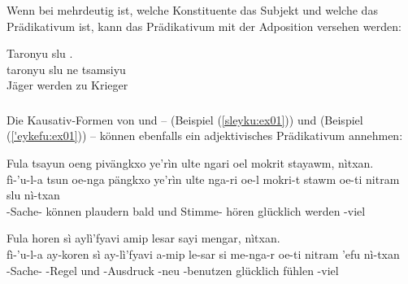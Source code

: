 \subsubsection{} Wenn bei   mehrdeutig ist, welche Konstituente das Subjekt und welche das Prädikativum ist, kann das Prädikativum mit der Adposition  versehen werden:

\begin{interlin}
	\glll Taronyu slu  . \\
	taronyu slu ne tsamsiyu \\
	Jäger werden zu Krieger \\
\end{interlin}
\label{syn:predicate:slu-ne}

\subsubsection{} Die Kausativ-Formen von  und  --  (Beispiel (\ref{sleyku:ex01})) und  (Beispiel (\ref{'eykefu:ex01})) -- können ebenfalls ein adjektivisches Prädikativum annehmen:

\begin{interlin} \label{sleyku:ex01}
	\glll \Npawl{}Fula tsayun oeng pivängkxo ye'rìn ulte ngari oel mokrit stayawm,    nìtxan. \\
	fì-'u-l-a tsun oe-nga pängkxo ye'rìn ulte nga-ri oe-l mokri-t stawm oe-ti nitram slu nì-txan\\
	-Sache- können  plaudern bald und   Stimme- hören  glücklich werden -viel\\
\end{interlin}

\begin{interlin} \label{'eykefu:ex01}
	\glll \Npawl{}Fula horen sì aylì'fyavi amip lesar sayi mengar,    nìtxan. \\
	fì-'u-l-a ay-koren sì ay-lì'fyavi a-mip le-sar si me-nga-r oe-ti nitram 'efu nì-txan \\
	-Sache- -Regel und -Ausdruck -neu -benutzen    glücklich fühlen -viel \\
\end{interlin}

